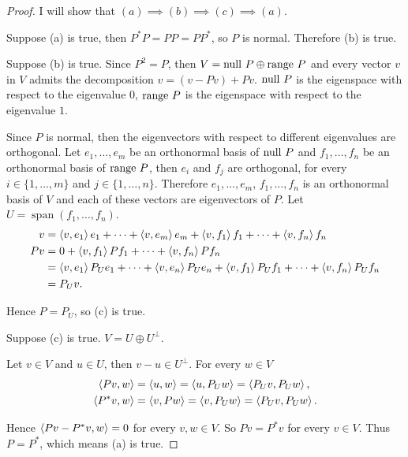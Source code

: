 \begin{proof}
    I will show that $(a) \implies (b) \implies (c) \implies (a)$.

    Suppose (a) is true, then $P^{*}P = PP = PP^{*}$, so $P$ is normal. Therefore (b) is true.

    Suppose (b) is true. Since $P^{2} = P$, then $V = \operatorname{null}\,{P}\oplus\operatorname{range}\,{P}$ and every vector $v$ in $V$ admits the decomposition $v = (v - Pv) + Pv$. $\operatorname{null}\,{P}$ is the eigenspace with respect to the eigenvalue $0$, $\operatorname{range}\,{P}$ is the eigenspace with respect to the eigenvalue $1$.

    Since $P$ is normal, then the eigenvectors with respect to different eigenvalues are orthogonal. Let $e_{1}, \ldots, e_{m}$ be an orthonormal basis of $\operatorname{null}\,{P}$ and $f_{1}, \ldots, f_{n}$ be an orthonormal basis of $\operatorname{range}\,{P}$, then $e_{i}$ and $f_{j}$ are orthogonal, for every $i\in\{1,\ldots, m\}$ and $j\in\{ 1,\ldots,n \}$. Therefore $e_{1}, \ldots, e_{m}$, $f_{1}, \ldots, f_{n}$ is an orthonormal basis of $V$ and each of these vectors are eigenvectors of $P$. Let $U = \operatorname{span}(f_{1}, \ldots, f_{n})$.
    \begin{align*}
        v & = \left\langle{v,e_{1}}\right\rangle e_{1} + \cdots + \left\langle{v,e_{m}}\right\rangle e_{m} + \left\langle{v, f_{1}}\right\rangle f_{1} + \cdots + \left\langle{v, f_{n}}\right\rangle f_{n} \\
        Pv & = 0 + \left\langle{v, f_{1}}\right\rangle Pf_{1} + \cdots + \left\langle{v, f_{n}}\right\rangle Pf_{n} \\
           & = \left\langle{v, e_{1}}\right\rangle P_{U}e_{1} + \cdots + \left\langle{v, e_{n}}\right\rangle P_{U}e_{n} + \left\langle{v, f_{1}}\right\rangle P_{U}f_{1} + \cdots + \left\langle{v, f_{n}}\right\rangle P_{U}f_{n} \\
           & = P_{U}v.
    \end{align*}

    Hence $P = P_{U}$, so (c) is true.

    Suppose (c) is true. $V = U\oplus U^{\bot}$.

    Let $v\in V$ and $u\in U$, then $v - u\in U^{\bot}$. For every $w\in V$
    \begin{align*}
        \left\langle{Pv, w}\right\rangle & = \left\langle{u, w}\right\rangle = \left\langle{u, P_{U}w}\right\rangle = \left\langle{P_{U}v, P_{U}w}\right\rangle, \\
        \left\langle{P^{*}v, w}\right\rangle & = \left\langle{v, Pw}\right\rangle = \left\langle{v, P_{U}w}\right\rangle = \left\langle{P_{U}v, P_{U}w}\right\rangle.
    \end{align*}

    Hence $\left\langle{Pv - P^{*}v, w}\right\rangle = 0$ for every $v, w\in V$. So $Pv = P^{*}v$ for every $v\in V$. Thus $P = P^{*}$, which means (a) is true.
\end{proof}
\newpage

